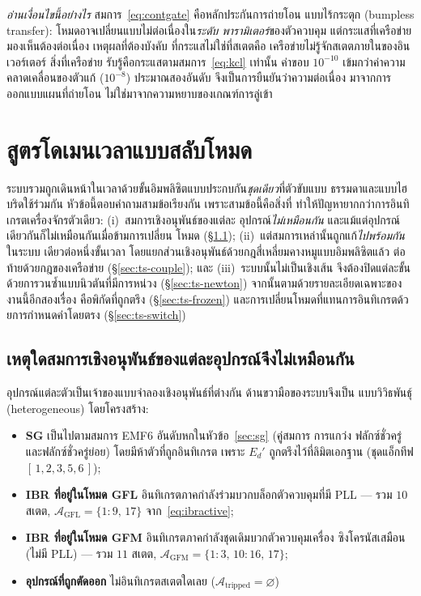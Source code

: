 \documentclass[12pt,a4paper]{article}
\begin{document}
\emph{อ่านเงื่อนไขนี้อย่างไร} สมการ~\eqref{eq:contgate} คือหลักประกันการถ่ายโอน
แบบไร้กระตุก (bumpless transfer): โหมดอาจเปลี่ยนแบบไม่ต่อเนื่องใน\emph{ระดับ
พารามิเตอร์}ของตัวควบคุม แต่กระแสที่เครือข่ายมองเห็นต้องต่อเนื่อง เหตุผลที่ต้องบังคับ
ที่กระแสไม่ใช่ที่สเตตคือ เครือข่ายไม่รู้จักสเตตภายในของอินเวอร์เตอร์ สิ่งที่เครือข่าย
รับรู้คือกระแสตามสมการ~\eqref{eq:kcl} เท่านั้น ค่าขอบ $10^{-10}$ เข้มกว่าค่าความ
คลาดเคลื่อนของตัวแก้ ($10^{-8}$) ประมาณสองอันดับ จึงเป็นการยืนยันว่าความต่อเนื่อง
มาจากการออกแบบแผนที่ถ่ายโอน ไม่ใช่มาจากความหยาบของเกณฑ์การลู่เข้า

\section{สูตรโดเมนเวลาแบบสลับโหมด}\label{sec:ts}
ระบบรวมถูกเดินหน้าในเวลาด้วยขั้นอิมพลิซิตแบบประกบกัน\emph{ชุดเดียว}ที่ตัวขับแบบ
ธรรมดาและแบบไฮบริดใช้ร่วมกัน หัวข้อนี้ตอบคำถามสามข้อเรียงกัน เพราะสามข้อนี้คือสิ่งที่
ทำให้ปัญหายากกว่าการอินทิเกรตเครื่องจักรตัวเดียว: (i)~สมการเชิงอนุพันธ์ของแต่ละ
อุปกรณ์\emph{ไม่เหมือนกัน} และแม้แต่อุปกรณ์เดียวกันก็ไม่เหมือนกันเมื่อข้ามการเปลี่ยน
โหมด (\S\ref{sec:ts-hetero}); (ii)~แต่สมการเหล่านั้นถูกแก้\emph{ไปพร้อมกัน}ในระบบ
เดียวต่อหนึ่งขั้นเวลา โดยแยกส่วนเชิงอนุพันธ์ด้วยกฎสี่เหลี่ยมคางหมูแบบอิมพลิซิตแล้ว
ต่อท้ายด้วยกฎของเครือข่าย (\S\ref{sec:ts-couple}); และ (iii)~ระบบนั้นไม่เป็นเชิงเส้น
จึงต้องปิดแต่ละขั้นด้วยการวนซ้ำแบบนิวตันที่มีการหน่วง (\S\ref{sec:ts-newton})
จากนั้นตามด้วยรายละเอียดเฉพาะของงานนี้อีกสองเรื่อง คือพิกัดที่ถูกตรึง
(\S\ref{sec:ts-frozen}) และการเปลี่ยนโหมดที่แทนการอินทิเกรตด้วยการกำหนดค่าโดยตรง
(\S\ref{sec:ts-switch})

\subsection{เหตุใดสมการเชิงอนุพันธ์ของแต่ละอุปกรณ์จึงไม่เหมือนกัน}\label{sec:ts-hetero}
อุปกรณ์แต่ละตัวเป็นเจ้าของแบบจำลองเชิงอนุพันธ์ที่ต่างกัน ด้านขวามือของระบบจึงเป็น
แบบวิวิธพันธุ์ (heterogeneous) โดยโครงสร้าง:
\begin{itemize}\itemsep2pt
  \item \textbf{SG} เป็นไปตามสมการ EMF6 อันดับหกในหัวข้อ~\ref{sec:sg} (คู่สมการ
        การแกว่ง ฟลักซ์ชั่วครู่ และฟลักซ์ชั่วครู่ย่อย) โดยมีห้าตัวที่ถูกอินทิเกรต
        เพราะ $E_d'$ ถูกตรึงไว้ที่ลิมิตเอกฐาน (ชุดแอ็กทีฟ $[\,1,2,3,5,6\,]$);
  \item \textbf{IBR ที่อยู่ในโหมด GFL} อินทิเกรตภาคกำลังร่วมบวกบล็อกตัวควบคุมที่มี
        PLL --- รวม $10$ สเตต, $\mathcal{A}_{\mathrm{GFL}}=\{1{:}9,\,17\}$
        จาก~\eqref{eq:ibractive};
  \item \textbf{IBR ที่อยู่ในโหมด GFM} อินทิเกรตภาคกำลังชุดเดิมบวกตัวควบคุมเครื่อง
        ซิงโครนัสเสมือน (ไม่มี PLL) --- รวม $11$ สเตต,
        $\mathcal{A}_{\mathrm{GFM}}=\{1{:}3,\,10{:}16,\,17\}$;
  \item \textbf{อุปกรณ์ที่ถูกตัดออก} ไม่อินทิเกรตสเตตใดเลย
        ($\mathcal{A}_{\mathrm{tripped}}=\varnothing$)
\end{itemize}
\end{document}
